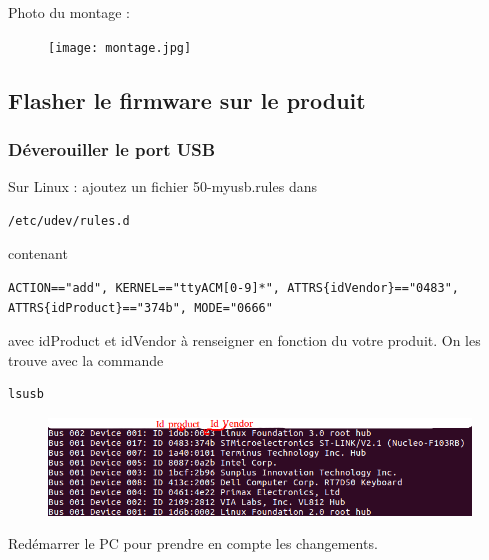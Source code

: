 \documentclass{article}
\begin{document}
Photo du montage :

\begin{figure}[H]
\begin{center}
\advance\leftskip-3cm
\advance\rightskip-3cm
\texttt{[image: montage.jpg]}

\label{visina8}
\end{center}\end{figure}

\subsection{Flasher le firmware sur le produit}

\subsubsection{Déverouiller le port USB}
Sur Linux : ajoutez un fichier 50-myusb.rules dans 
\begin{verbatim}
/etc/udev/rules.d

\end{verbatim}
contenant 
\begin{verbatim}
ACTION=="add", KERNEL=="ttyACM[0-9]*", ATTRS{idVendor}=="0483",
ATTRS{idProduct}=="374b", MODE="0666"

\end{verbatim}
avec idProduct et idVendor à renseigner en fonction du votre produit. On les trouve avec la commande 
\begin{verbatim}
lsusb

\end{verbatim}

\begin{figure}[H]
\begin{center}
\advance\leftskip-3cm
\advance\rightskip-3cm
\includegraphics[keepaspectratio=true,scale=0.5]{lsusb2_fleches.png}

\label{visina8}
\end{center}\end{figure}

Redémarrer le PC pour prendre en compte les changements.
\end{document}
